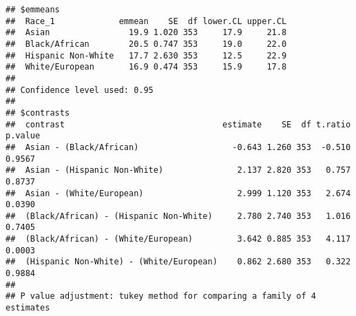 \documentclass[
  doc,draftall]{apa6}
\begin{document}
\begin{verbatim}
## $emmeans
##  Race_1             emmean    SE  df lower.CL upper.CL
##  Asian                19.9 1.020 353     17.9     21.8
##  Black/African        20.5 0.747 353     19.0     22.0
##  Hispanic Non-White   17.7 2.630 353     12.5     22.9
##  White/European       16.9 0.474 353     15.9     17.8
## 
## Confidence level used: 0.95 
## 
## $contrasts
##  contrast                                estimate    SE  df t.ratio p.value
##  Asian - (Black/African)                   -0.643 1.260 353  -0.510  0.9567
##  Asian - (Hispanic Non-White)               2.137 2.820 353   0.757  0.8737
##  Asian - (White/European)                   2.999 1.120 353   2.674  0.0390
##  (Black/African) - (Hispanic Non-White)     2.780 2.740 353   1.016  0.7405
##  (Black/African) - (White/European)         3.642 0.885 353   4.117  0.0003
##  (Hispanic Non-White) - (White/European)    0.862 2.680 353   0.322  0.9884
## 
## P value adjustment: tukey method for comparing a family of 4 estimates
\end{verbatim}
\end{document}
